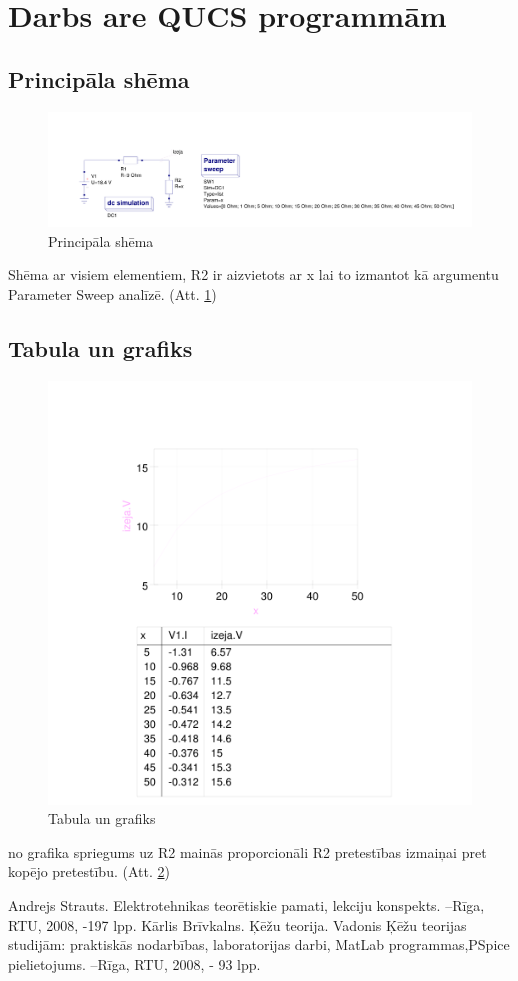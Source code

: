 \documentclass{report}
\begin{document}
\section{Darbs are QUCS programmām}
\subsection{Principāla shēma}
\begin{figure}[!tb]
\includegraphics[width=\textwidth,height=\textheight,keepaspectratio]{IMAGES/02.png}
\caption{Principāla shēma}
\label{Principala shema}
\end{figure}
Shēma ar visiem elementiem, R2 ir aizvietots ar x lai to izmantot kā argumentu Parameter Sweep analīzē. (Att. \ref{Principala shema})
\subsection{Tabula un grafiks}
\begin{figure}[!tb]
\includegraphics[width=\textwidth,height=\textheight,keepaspectratio]{IMAGES/02graphic.png}
\caption{Tabula un grafiks}
\label{Tabula un grafiks}
\end{figure}
no grafika spriegums uz R2 mainās proporcionāli R2 pretestības izmaiņai pret kopējo pretestību. (Att. \ref{Tabula un grafiks})
\begin{thebibliography}{9}
Andrejs Strauts. Elektrotehnikas teorētiskie pamati, lekciju konspekts. –Rīga,
RTU, 2008, -197 lpp.
Kārlis Brīvkalns. Ķēžu teorija. Vadonis Ķēžu teorijas studijām: praktiskās
nodarbības, laboratorijas darbi, MatLab programmas,PSpice pielietojums. –Rīga,
RTU, 2008, - 93 lpp.
\end{thebibliography}
\end{document}
